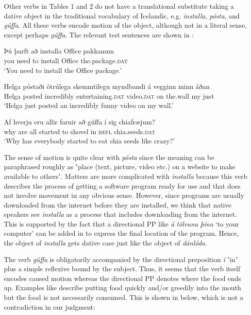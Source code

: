 \documentclass[output=paper,modfonts,nonflat]{langsci/langscibook}
\begin{document}
Other verbs in Tables 1 and 2 do not have a translational substitute taking a dative object in the traditional vocabulary of Icelandic, e.g. \textit{installa}, \textit{pósta}, and \textit{gúffa}. All these verbs encode motion of the object, although not in a literal sense, except perhaps \textit{gúffa}. The relevant test sentences are shown in : 


\ea%
    \label{ex:jonsson:3}
\ea\label{ex:jonsson:3a}
\gll   Þú   þarft   að   installa   Office   pakkanum\\
     you   need   to   install   Office   the.package.\textsc{dat}\\
\glt `You need to install the Office package.'
 
\ex\label{ex:jonsson:3b}
\gll   Helga  póstaði  ótrúlega  skemmtilegu  myndbandi  á  vegginn  minn  áðan\\
 Helga   posted   incredibly   entertaining.\textsc{dat}   video.\textsc{dat}   on   the.wall   my   just\\
\glt `Helga just posted an incredibly funny video on my wall.'
 

\ex\label{ex:jonsson:3c}
\gll   Af hverju  eru  allir  farnir  að  gúffa  í  sig  chiafræjum?\\
 why   are   all   started   to   shovel   in   \textsc{refl}   chia.seeds.\textsc{dat}\\
\glt `Why has everybody started to eat chia seeds like crazy?'
\z
\z

The sense of motion is quite clear with \textit{pósta} since the meaning can be paraphrased roughly as ʽplace (text, picture, video etc.) on a website to make available to othersʼ. Matters are more complicated with \textit{installa} because this verb describes the process of getting a software program ready for use and that does not involve movement in any obvious sense. However, since programs are usually downloaded from the internet before they are installed, we think that native speakers see \textit{installa} as a process that includes downloading from the internet. This is supported by the fact that a directional PP like \textit{á} \textit{tölvuna} \textit{þína} ‘to your computer’ can be added in  to express the final location of the program. Hence, the object of \textit{installa} gets dative case just like the object of \textit{dánlóda}. 

The verb \textit{gúffa} is obligatorily accompanied by the directional preposition \textit{í} ʽinʼ plus a simple reflexive bound by the subject. Thus, it seems that the verb itself encodes caused motion whereas the directional PP denotes where the food ends up. Examples like  describe putting food quickly and/or greedily into the mouth but the food is not necessarily consumed. This is shown in  below, which is not a contradiction in our judgment: 
\end{document}

